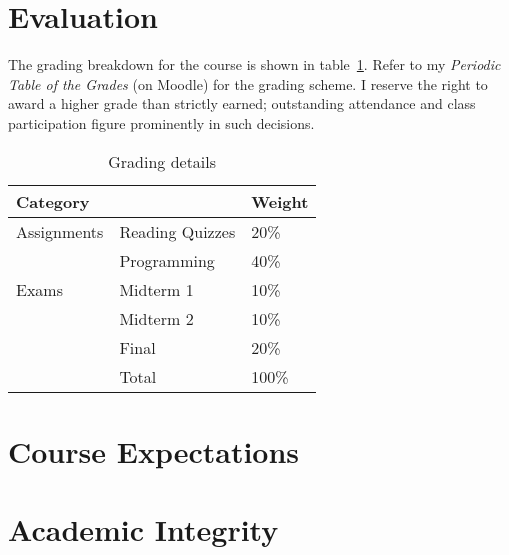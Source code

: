 \documentclass[11pt]{article}
\begin{document}


\section{Evaluation}

The grading breakdown for the course
is shown in table~\ref{tab:grading}.
Refer to my \emph{Periodic Table of the Grades} (on Moodle)
for the grading scheme.
I reserve the right to award a higher grade than strictly earned;
outstanding attendance and class participation
figure prominently in such decisions.

\begin{table}[htb]
  \centering
\begin{tabular}{lll}
\toprule
Category    &                 & Weight \\
\midrule
Assignments & Reading Quizzes & 20\%   \\
            & Programming     & 40\%   \\
Exams       & Midterm 1       & 10\%   \\
            & Midterm 2       & 10\%   \\
            & Final           & 20\%   \\
\midrule
            & Total           & 100\%  \\
\bottomrule
\end{tabular}
  \caption{Grading details}
  \label{tab:grading}
\end{table}
\begin{comment}
  #+ORGTBL: SEND grades orgtbl-to-latex :splice nil :skip 0 :booktabs t
  | Category    |                 | Weight |
  |-------------+-----------------+--------|
  | Assignments | Reading Quizzes |    20%
  |             | Programming     |    40%
  | Exams       | Midterm 1       |    10%
  |             | Midterm 2       |    10%
  |             | Final           |    20%
  |-------------+-----------------+--------|
  |             | Total           |   100%
  #+TBLFM: @7$3=100*vsum(@I..II);%
\end{comment}

\section{Course Expectations}



\section{Academic Integrity}



\end{document}

